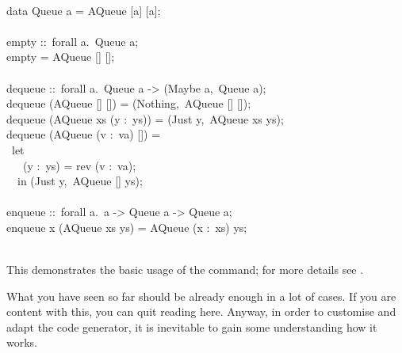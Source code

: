 \begin{isabellebody}
\begin{isamarkuptext}
\hspace*{0pt}\\
\hspace*{0pt}data Queue a = AQueue [a] [a];\\
\hspace*{0pt}\\
\hspace*{0pt}empty ::~forall a.~Queue a;\\
\hspace*{0pt}empty = AQueue [] [];\\
\hspace*{0pt}\\
\hspace*{0pt}dequeue ::~forall a.~Queue a -> (Maybe a,~Queue a);\\
\hspace*{0pt}dequeue (AQueue [] []) = (Nothing,~AQueue [] []);\\
\hspace*{0pt}dequeue (AQueue xs (y :~ys)) = (Just y,~AQueue xs ys);\\
\hspace*{0pt}dequeue (AQueue (v :~va) []) =\\
\hspace*{0pt} ~let {}\\
\hspace*{0pt} ~~~(y :~ys) = rev (v :~va);\\
\hspace*{0pt} ~{}~in (Just y,~AQueue [] ys);\\
\hspace*{0pt}\\
\hspace*{0pt}enqueue ::~forall a.~a -> Queue a -> Queue a;\\
\hspace*{0pt}enqueue x (AQueue xs ys) = AQueue (x :~xs) ys;\\
\hspace*{0pt}\\
\hspace*{0pt}{\char125}%
\end{isamarkuptext}%
\isamarkuptrue%
%
\endisatagquote
{\isafoldquote}%
%
\isadelimquote
%
\endisadelimquote
%
\begin{isamarkuptext}%
\noindent This demonstrates the basic usage of the \hyperlink{command.export-code}{\mbox{}} command;
  for more details see .%
\end{isamarkuptext}%
\isamarkuptrue%
%
\isamarkuptrue%
%
\begin{isamarkuptext}%
What you have seen so far should be already enough in a lot of cases.  If you
  are content with this, you can quit reading here.  Anyway, in order to customise
  and adapt the code generator, it is inevitable to gain some understanding
  how it works.


\end{isamarkuptext}
\end{isabellebody}
